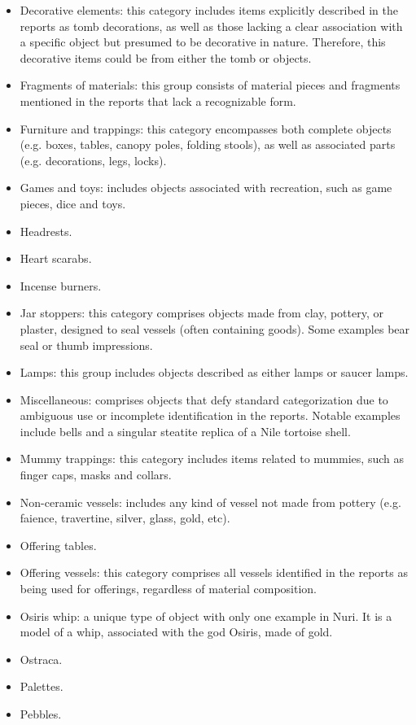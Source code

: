 \begin{itemize}
	\item Decorative elements: this category includes items explicitly described in the reports as tomb decorations, as well as those lacking a clear association with a specific object but presumed to be decorative in nature. Therefore, this decorative items could be from either the tomb or objects.
	\item Fragments of materials: this group consists of material pieces and fragments mentioned in the reports that lack a recognizable form.
	\item Furniture and trappings: this category encompasses both complete objects (e.g. boxes, tables, canopy poles, folding stools), as well as associated parts (e.g. decorations, legs, locks).
	\item Games and toys: includes objects associated with recreation, such as game pieces, dice and toys.
	\item Headrests.
	\item Heart scarabs.
	\item Incense burners.
	\item Jar stoppers: this category comprises objects made from clay, pottery, or plaster, designed to seal vessels (often containing goods). Some examples bear seal or thumb impressions.
	\item Lamps: this group includes objects described as either lamps or saucer lamps.
	\item Miscellaneous: comprises objects that defy standard categorization due to ambiguous use or incomplete identification in the reports. Notable examples include bells and a singular steatite replica of a Nile tortoise shell.
	\item Mummy trappings: this category includes items related to mummies, such as finger caps, masks and collars.
	\item Non-ceramic vessels: includes any kind of vessel not made from pottery (e.g. faience, travertine, silver, glass, gold, etc).
	\item Offering tables.
	\item Offering vessels: this category comprises all vessels identified in the reports as being used for offerings, regardless of material composition.
	\item Osiris whip: a unique type of object with only one example in Nuri. It is a model of a whip, associated with the god Osiris, made of gold.
	\item Ostraca.
	\item Palettes.
	\item Pebbles.

\end{itemize}
